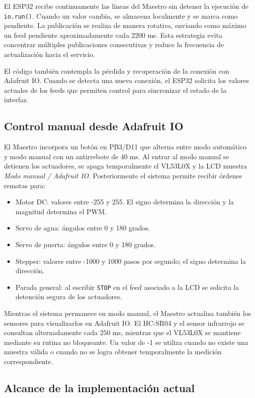 El ESP32 recibe continuamente las líneas del Maestro sin detener la ejecución de \texttt{io.run()}. Cuando un valor cambia, se almacena localmente y se marca como pendiente. La publicación se realiza de manera rotativa, enviando como máximo un feed pendiente aproximadamente cada 2200 ms. Esta estrategia evita concentrar múltiples publicaciones consecutivas y reduce la frecuencia de actualización hacia el servicio.

El código también contempla la pérdida y recuperación de la conexión con Adafruit IO. Cuando se detecta una nueva conexión, el ESP32 solicita los valores actuales de los feeds que permiten control para sincronizar el estado de la interfaz.

\subsection{Control manual desde Adafruit IO}

El Maestro incorpora un botón en PB3/D11 que alterna entre modo automático y modo manual con un antirrebote de 40 ms. Al entrar al modo manual se detienen los actuadores, se apaga temporalmente el VL53L0X y la LCD muestra \textit{Modo manual / Adafruit IO}. Posteriormente el sistema permite recibir órdenes remotas para:

\begin{itemize}
    \item Motor DC: valores entre -255 y 255. El signo determina la dirección y la magnitud determina el PWM.
    \item Servo de agua: ángulos entre 0 y 180 grados.
    \item Servo de puerta: ángulos entre 0 y 180 grados.
    \item Stepper: valores entre -1000 y 1000 pasos por segundo; el signo determina la dirección.
    \item Parada general: al escribir \texttt{STOP} en el feed asociado a la LCD se solicita la detención segura de los actuadores.
\end{itemize}

Mientras el sistema permanece en modo manual, el Maestro actualiza también los sensores para visualizarlos en Adafruit IO. El HC-SR04 y el sensor infrarrojo se consultan alternadamente cada 250 ms, mientras que el VL53L0X se mantiene mediante su rutina no bloqueante. Un valor de -1 se utiliza cuando no existe una muestra válida o cuando no se logra obtener temporalmente la medición correspondiente.

\subsection{Alcance de la implementación actual}

